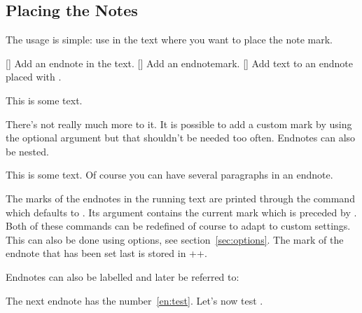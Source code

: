 \documentclass[load-preamble+]{cnltx-doc}
\begin{document}
\subsection{Placing the Notes}
The usage is simple: use  in the text where you want to place the
note mark.
\begin{commands}
  []
    Add an endnote in the text.
  []
    Add an endnotemark.
  []
    Add text to an endnote placed with .
\end{commands}
\begin{example}
  This is some text.
\end{example}
There's not really much more to it.  It is possible to add a custom mark by
using the optional argument but that shouldn't be needed too often.  Endnotes
can also be nested.

\begin{example}
  This is some text.
  Of course you can have several paragraphs\endnote{\kant[1-3]} in an endnote.
\end{example}

The marks of the endnotes in the running text are printed through the command
 which defaults to .  Its argument
contains the current mark which is preceded by .  Both of
these commands can be redefined of course to adapt to custom settings.  This
can also be done using options, see section~\ref{sec:options}.  The mark of
the endnote that has been set last is stored in
\verbcode+\@currentlabel+.

Endnotes can also be labelled and later be referred to:
\begin{example}
  The next endnote\label{en:test} has
  the number~\ref{en:test}.  Let's now test
  \endnotemark[\ref{en:test}].
\end{example}
\end{document}
